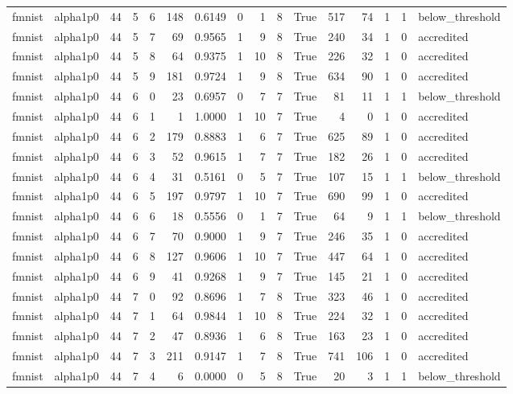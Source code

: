 \begin{tabular}{llrrrrrrrrrrrrrl}
fmnist & alpha1p0 & 44 & 5 & 6 & 148 & 0.6149 & 0 & 1 & 8 & True & 517 & 74 & 1 & 1 & below\_threshold \\
fmnist & alpha1p0 & 44 & 5 & 7 & 69 & 0.9565 & 1 & 9 & 8 & True & 240 & 34 & 1 & 0 & accredited \\
fmnist & alpha1p0 & 44 & 5 & 8 & 64 & 0.9375 & 1 & 10 & 8 & True & 226 & 32 & 1 & 0 & accredited \\
fmnist & alpha1p0 & 44 & 5 & 9 & 181 & 0.9724 & 1 & 9 & 8 & True & 634 & 90 & 1 & 0 & accredited \\
fmnist & alpha1p0 & 44 & 6 & 0 & 23 & 0.6957 & 0 & 7 & 7 & True & 81 & 11 & 1 & 1 & below\_threshold \\
fmnist & alpha1p0 & 44 & 6 & 1 & 1 & 1.0000 & 1 & 10 & 7 & True & 4 & 0 & 1 & 0 & accredited \\
fmnist & alpha1p0 & 44 & 6 & 2 & 179 & 0.8883 & 1 & 6 & 7 & True & 625 & 89 & 1 & 0 & accredited \\
fmnist & alpha1p0 & 44 & 6 & 3 & 52 & 0.9615 & 1 & 7 & 7 & True & 182 & 26 & 1 & 0 & accredited \\
fmnist & alpha1p0 & 44 & 6 & 4 & 31 & 0.5161 & 0 & 5 & 7 & True & 107 & 15 & 1 & 1 & below\_threshold \\
fmnist & alpha1p0 & 44 & 6 & 5 & 197 & 0.9797 & 1 & 10 & 7 & True & 690 & 99 & 1 & 0 & accredited \\
fmnist & alpha1p0 & 44 & 6 & 6 & 18 & 0.5556 & 0 & 1 & 7 & True & 64 & 9 & 1 & 1 & below\_threshold \\
fmnist & alpha1p0 & 44 & 6 & 7 & 70 & 0.9000 & 1 & 9 & 7 & True & 246 & 35 & 1 & 0 & accredited \\
fmnist & alpha1p0 & 44 & 6 & 8 & 127 & 0.9606 & 1 & 10 & 7 & True & 447 & 64 & 1 & 0 & accredited \\
fmnist & alpha1p0 & 44 & 6 & 9 & 41 & 0.9268 & 1 & 9 & 7 & True & 145 & 21 & 1 & 0 & accredited \\
fmnist & alpha1p0 & 44 & 7 & 0 & 92 & 0.8696 & 1 & 7 & 8 & True & 323 & 46 & 1 & 0 & accredited \\
fmnist & alpha1p0 & 44 & 7 & 1 & 64 & 0.9844 & 1 & 10 & 8 & True & 224 & 32 & 1 & 0 & accredited \\
fmnist & alpha1p0 & 44 & 7 & 2 & 47 & 0.8936 & 1 & 6 & 8 & True & 163 & 23 & 1 & 0 & accredited \\
fmnist & alpha1p0 & 44 & 7 & 3 & 211 & 0.9147 & 1 & 7 & 8 & True & 741 & 106 & 1 & 0 & accredited \\
fmnist & alpha1p0 & 44 & 7 & 4 & 6 & 0.0000 & 0 & 5 & 8 & True & 20 & 3 & 1 & 1 & below\_threshold \\

\end{tabular}
